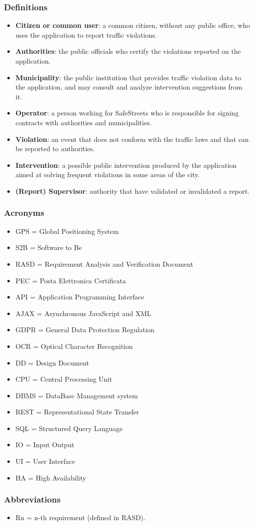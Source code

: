 \subsubsection{Definitions}
\begin{itemize}
	\item \textbf{Citizen or common user}: a common citizen, without any public office, who uses the application to report traffic violations.
	\item \textbf{Authorities}: the public officials who certify the violations reported on the application.
	\item \textbf{Municipality}: the public institution that provides traffic violation data to the application, and may consult and analyze intervention suggestions from it.
	\item \textbf{Operator}: a person working for SafeStreets who is responsible for signing contracts with authorities and municipalities.
	\item \textbf{Violation}: an event that does not conform with the traffic laws and that can be reported to authorities.
	\item \textbf{Intervention}: a possible public intervention produced by the application aimed at solving frequent violations in some areas of the city.
	\item \textbf{(Report) Supervisor}: authority that have validated or invalidated a report.
\end{itemize}
\subsubsection{Acronyms}
\begin{itemize}
	\item GPS = Global Positioning System
	\item S2B = Software to Be
	\item RASD = Requirement Analysis and Verification Document
	\item PEC = Posta Elettronica Certificata
	\item API = Application Programming Interface
	\item AJAX = Asynchronous JavaScript and XML
	\item GDPR = General Data Protection Regulation
	\item OCR = Optical Character Recognition
	\item DD = Design Document
	\item CPU = Central Processing Unit
	\item DBMS = DataBase Management system
	\item REST = Representational State Transfer
	\item SQL = Structured Query Language
	\item IO = Input Output
	\item UI = User Interface
	\item HA = High Availability
\end{itemize}
\subsubsection{Abbreviations}
\begin{itemize}
	\item Rn = n-th requirement (defined in RASD).
\end{itemize}
